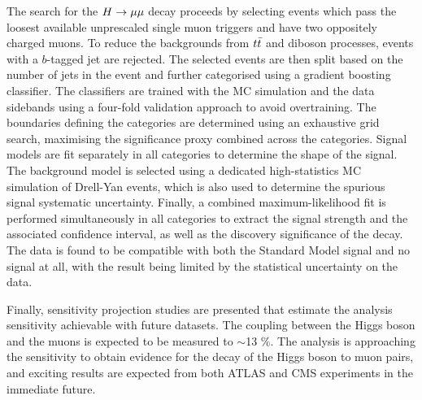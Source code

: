 The search for the $H \rightarrow \mu\mu$ decay proceeds by selecting
events which pass the loosest available unprescaled
single muon triggers and have two oppositely charged
muons. To reduce the backgrounds from $t\bar{t}$ and diboson
processes, events with a $b$-tagged jet are rejected.
The selected events are then split based on the number
of jets in the event and further categorised using a 
gradient boosting classifier. The classifiers are trained
with the MC simulation and the data sidebands using a four-fold
validation approach to avoid overtraining. The boundaries
defining the categories are determined using an exhaustive
grid search, maximising the significance proxy combined
across the categories. Signal models are fit separately
in all categories to determine the shape of the signal.
The background model is selected using a dedicated
high-statistics MC simulation of Drell-Yan events, which
is also used to determine the spurious signal systematic
uncertainty. Finally, a combined maximum-likelihood fit
is performed simultaneously in all categories to
extract the signal strength and the associated confidence
interval, as well as the discovery significance of the
decay. The data is found to be compatible with both the
Standard Model signal and no signal at all, with the
result being limited by the statistical uncertainty on
the data.

Finally, sensitivity projection studies are presented
that estimate the analysis sensitivity achievable
with future datasets. The coupling between the Higgs boson
and the muons is expected to be measured to $\sim$13 \%.
The analysis is approaching the
sensitivity to obtain evidence for the decay of the 
Higgs boson to muon pairs, and exciting results are
expected from both ATLAS and CMS experiments in the 
immediate future.






